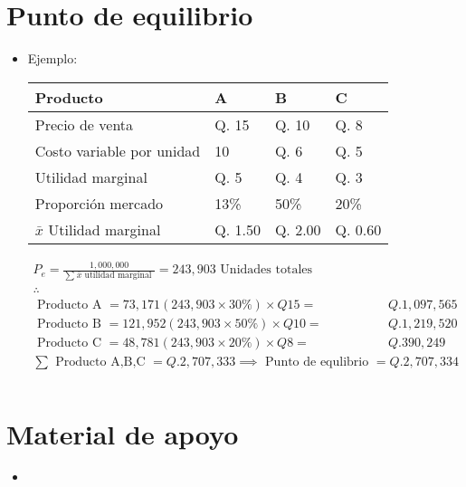\section{Punto de equilibrio}
\begin{itemize}
    \item Ejemplo: 
        \begin{center}
           \begin{tabular}{ | p{5cm} | p{5cm} | p{5cm} | p{5cm} | }
               \hline
                    Producto & A & B & C    \\ 
                \hline
                    Precio de venta & Q. 15 & Q. 10 & Q. 8 \\  
                    Costo variable por unidad & 10 & Q. 6 & Q. 5\\ 
                    Utilidad marginal & Q. 5 & Q. 4 & Q. 3 \\ 
               \hline
               Proporción mercado & 13\% & 50\% & 20\% \\ 
               $\bar{x}$ Utilidad marginal & Q. 1.50 & Q. 2.00 & Q. 0.60 \\ 
           \end{tabular}
            \begin{align*}
                P_e = \frac{1,000,000}{\sum_{}^{}\bar{x}\text{  utilidad marginal  }} = 243,903 \text{  Unidades totales  } \\ 
                \therefore \quad \\ 
                \text{  Producto A  } = 73,171 (243,903 \times 30\%) \times Q15 =& Q. 1,097,565 \\ 
                \text{  Producto B  } = 121,952 (243,903 \times 50\%) \times Q10 =& Q. 1,219,520 \\ 
                \text{  Producto C  } = 48,781 (243,903 \times 20\%) \times Q8 =& Q. 390,249 \\ 
                \sum_{}^{}\text{  Producto A,B,C  } = Q. 2,707,333 \implies \text{  Punto de equlibrio  } = Q. 2,707,334 \\ 
            \end{align*}
        \end{center}
\end{itemize}

\section{Material de apoyo}
\begin{itemize}
    \item \begin{figure}[htbp] 
        \centering
        \caption{}
        \label{}
    \end{figure}
\end{itemize}
